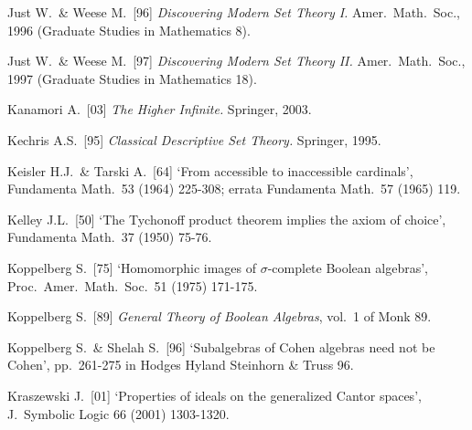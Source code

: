 {%

Just W.\ \& Weese M.\ [96] {\it Discovering Modern Set Theory I.}
Amer.\ Math.\ Soc., 1996 (Graduate Studies in Mathematics 8).
\cmmnt{[{\it Intro.}, 5A1E.]}

Just W.\ \& Weese M.\ [97] {\it Discovering Modern Set Theory II.}
Amer.\ Math.\ Soc., 1997 (Graduate Studies in Mathematics 18).
\cmmnt{[5A1G.]}

\medskip%



Kanamori A.\ [03] {\it The Higher Infinite.}   Springer, 2003.

Kechris A.S.\ [95] {\it Classical Descriptive Set Theory.}  Springer,
1995.
\cmmnt{[\S567 {\it notes\/}.]}

Keisler H.J.\ \& Tarski A.\ [64] `From accessible to
inaccessible cardinals', Fundamenta Math.\ 53 (1964) 225-308;  errata
Fundamenta Math.\ 57 (1965) 119.

Kelley J.L.\ [50] `The Tychonoff product theorem implies the axiom of
choice', Fundamenta Math.\ 37 (1950) 75-76.
\cmmnt{[561D.]}

Koppelberg S.\ [75]
`Homomorphic images of $\sigma$-complete Boolean algebras',
Proc.\ Amer.\ Math.\ Soc.\ 51 (1975) 171-175.
\cmmnt{[515L.]}

Koppelberg S.\ [89] {\it General Theory of Boolean
Algebras\/}, vol.\ 1 of {\smc Monk 89}.
\cmmnt{[514Xi, \S515 {\it notes\/}.]}

Koppelberg S.\ \& Shelah S.\ [96]
`Subalgebras of Cohen algebras need not be Cohen',
pp.\ 261-275 in {\smc Hodges Hyland Steinhorn \& Truss 96}.
\cmmnt{[\S546 {\it notes\/}.]}

Kraszewski J.\ [01] `Properties of ideals on the generalized Cantor spaces',
J.\ Symbolic Logic 66 (2001) 1303-1320.
\cmmnt{[523G, 523H, 523J, \S523 {\it notes\/}.]}



}

